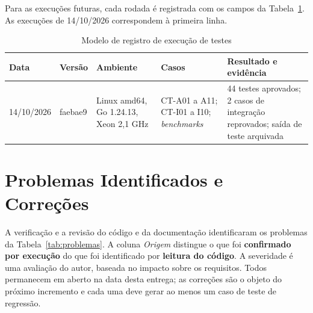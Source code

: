 Para as execuções futuras, cada rodada é registrada com os campos da Tabela~\ref{tab:modelo_ev}. As execuções de 14/10/2026 correspondem à primeira linha.

\begin{table}[htb]
\centering
\caption{Modelo de registro de execução de testes}\label{tab:modelo_ev}
\small
\begin{tabular}{|p{1.9cm}|p{2.1cm}|p{3.2cm}|p{2.6cm}|p{3.7cm}|}
\hline
\textbf{Data} & \textbf{Versão} & \textbf{Ambiente} & \textbf{Casos} & \textbf{Resultado e evidência} \\ \hline
14/10/2026 & faebae9 & Linux amd64, Go 1.24.13, Xeon 2,1 GHz & CT-A01 a A11; CT-I01 a I10; \textit{benchmarks} & 44 testes aprovados; 2 casos de integração reprovados; saída de teste arquivada \\ \hline
\end{tabular}
\end{table}

\section{Problemas Identificados e Correções}
\label{sec:test_problemas}

A verificação e a revisão do código e da documentação identificaram os problemas da Tabela~\ref{tab:problemas}. A coluna \textit{Origem} distingue o que foi \textbf{confirmado por execução} do que foi identificado por \textbf{leitura do código}. A severidade é uma avaliação do autor, baseada no impacto sobre os requisitos. Todos permanecem em aberto na data desta entrega; as correções são o objeto do próximo incremento e cada uma deve gerar ao menos um caso de teste de regressão.


